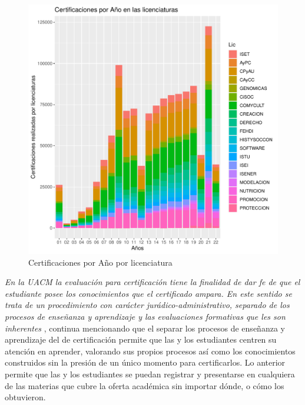\documentclass[12pt]{article}
\begin{document}
\begin{figure}
\centering
\includegraphics[scale=0.45]{Graficas/ggplotBarplotAnhoLic.pdf}
\caption{Certificaciones por A\~no por licenciatura}
\label{Fig.Cert.Anho-Lic}
\end{figure}




\textit{En la UACM la evaluaci\'on para certificaci\'on tiene la finalidad de dar fe de que el estudiante posee los conocimientos que el certificado ampara. En este sentido se trata de un procedimiento con car\'acter jur\'adico-administrativo, separado de los procesos de ense\~nanza y aprendizaje y las evaluaciones formativas que les son inherentes} \cite{ProyectoEducativo}, continua mencionando que el separar los procesos de ense\~nanza y aprendizaje del de certificaci\'on permite que las y los estudiantes centren su atenci\'on en aprender,  valorando sus propios procesos as\'i como los conocimientos construidos sin la presi\'on de un \'unico momento para certificarlos. Lo anterior permite que las y los estudiantes se puedan registrar y presentarse en cualquiera de las materias que cubre la oferta acad\'emica sin importar d\'onde, o c\'omo los obtuvieron. 
\end{document}
